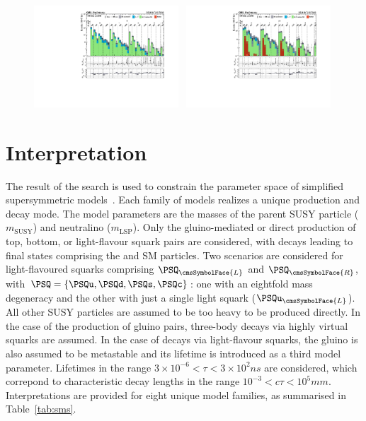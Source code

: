 \begin{figure}[!t]
  \includegraphics[width=0.48\textwidth, trim=10 0 60 10, clip=true]{Figures/5jet_cr-only.pdf}~
  \includegraphics[width=0.48\textwidth, trim=10 0 60 10, clip=true]{Figures/6jet_cr-only.pdf}\\
  \label{fig:result}
\end{figure}


\section{Interpretation}
\label{sec:interpretations}

The result of the search is used to constrain the parameter space of
simplified supersymmetric models~\cite{Alwall:2008ag, Alwall:2008va,
  sms}. Each family of models realizes a unique production and decay
mode. The model parameters are the masses of the parent SUSY particle
($m_\text{SUSY}$) and neutralino ($m_\text{LSP}$). Only the
gluino-mediated or direct production of top, bottom, or light-flavour
squark pairs are considered, with decays leading to final states
comprising the \chiz and SM particles. Two scenarios are considered
for light-flavoured squarks comprising $\PSQ_\cmsSymbolFace{L}$ and
$\PSQ_\cmsSymbolFace{R}$, with $\PSQ = \{\PSQu, \PSQd, \PSQs,
\PSQc\}$: one with an eightfold mass degeneracy and the other with
just a single light squark (\eg $\PSQu_\cmsSymbolFace{L}$). All other
SUSY particles are assumed to be too heavy to be produced directly. In
the case of the production of gluino pairs, three-body decays via
highly virtual squarks are assumed. In the case of decays via
light-flavour squarks, the gluino is also assumed to be metastable and
its lifetime is introduced as a third model parameter. Lifetimes in
the range $3{\times}10^{-6} < \tau < 3{\times}10^{2}\unit{ns}$ are
considered, which correpond to characteristic decay lengths in the
range $10^{-3} < c\tau < 10^{5}\unit{mm}$. Interpretations are
provided for eight unique model families, as summarised in
Table~\ref{tab:sms}.

